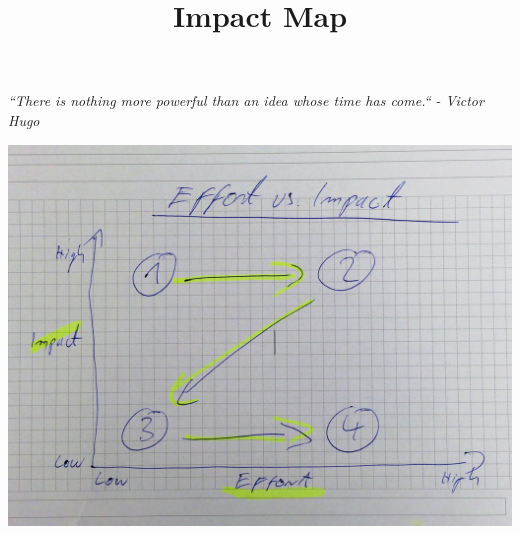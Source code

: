 \documentclass{ximera}
\title{Impact Map}
\begin{document}
\begin{abstract}

\end{abstract}
\maketitle

\newline

\emph{``There is nothing more powerful than an idea whose time has come.``  {\color{grey}- Victor Hugo}}

\newline

\begin{image}
\includegraphics{e_vs_i.jpg}
\end{image}
\end{document}

